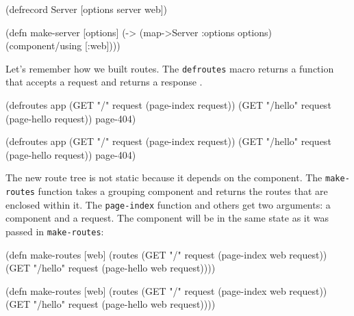 \begin{english}
  \begin{clojure}
(defrecord Server
  [options server web])

(defn make-server [options]
  (-> (map->Server {:options options})
      (component/using [:web])))
  \end{clojure}
\end{english}


Let's remember how we built routes. The \verb|defroutes| macro returns a function that accepts a request and returns a response .

\ifnarrow

\begin{english}
  \begin{clojure}
(defroutes app
  (GET "/"
    request (page-index request))
  (GET "/hello"
    request (page-hello request))
  page-404)
  \end{clojure}
\end{english}

\else

\begin{english}
  \begin{clojure}
(defroutes app
  (GET "/"      request (page-index request))
  (GET "/hello" request (page-hello request))
  page-404)
  \end{clojure}
\end{english}

\fi

The new route tree is not static because it depends on the component. The \verb|make-routes| function takes a grouping component and returns the routes that are enclosed within it. The \verb|page-index| function and others get two arguments: a component and a request. The component will be in the same state as it was passed in \verb|make-routes|:

\ifnarrow

\begin{english}
  \begin{clojure}
(defn make-routes [web]
  (routes
    (GET "/"
      request (page-index web request))
    (GET "/hello"
      request (page-hello web request))))
  \end{clojure}
\end{english}

\else

\begin{english}
  \begin{clojure}
(defn make-routes [web]
  (routes
   (GET "/"      request (page-index web request))
   (GET "/hello" request (page-hello web request))))
  \end{clojure}
\end{english}


